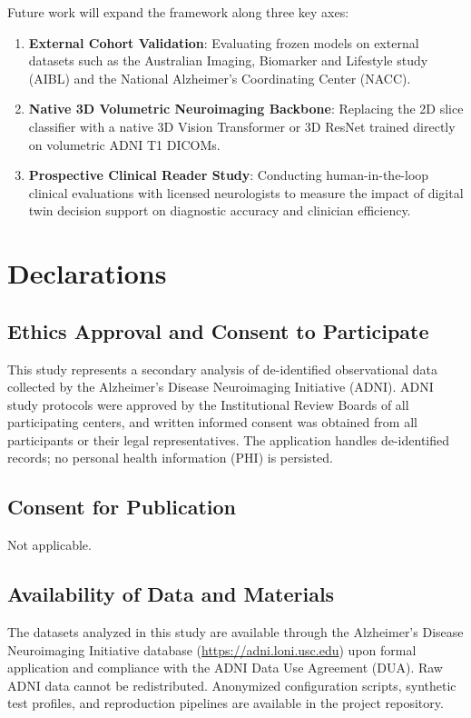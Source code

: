 \documentclass[11pt,a4paper]{article}
\begin{document}
Future work will expand the framework along three key axes:
\begin{enumerate}
    \item \textbf{External Cohort Validation}: Evaluating frozen models on external datasets such as the Australian Imaging, Biomarker and Lifestyle study (AIBL) and the National Alzheimer's Coordinating Center (NACC).
    \item \textbf{Native 3D Volumetric Neuroimaging Backbone}: Replacing the 2D slice classifier with a native 3D Vision Transformer or 3D ResNet trained directly on volumetric ADNI T1 DICOMs.
    \item \textbf{Prospective Clinical Reader Study}: Conducting human-in-the-loop clinical evaluations with licensed neurologists to measure the impact of digital twin decision support on diagnostic accuracy and clinician efficiency.
\end{enumerate}


\section*{Declarations}

\subsection*{Ethics Approval and Consent to Participate}
This study represents a secondary analysis of de-identified observational data collected by the Alzheimer's Disease Neuroimaging Initiative (ADNI). ADNI study protocols were approved by the Institutional Review Boards of all participating centers, and written informed consent was obtained from all participants or their legal representatives. The application handles de-identified records; no personal health information (PHI) is persisted.

\subsection*{Consent for Publication}
Not applicable.

\subsection*{Availability of Data and Materials}
The datasets analyzed in this study are available through the Alzheimer's Disease Neuroimaging Initiative database (\url{https://adni.loni.usc.edu}) upon formal application and compliance with the ADNI Data Use Agreement (DUA). Raw ADNI data cannot be redistributed. Anonymized configuration scripts, synthetic test profiles, and reproduction pipelines are available in the project repository.
\end{document}
